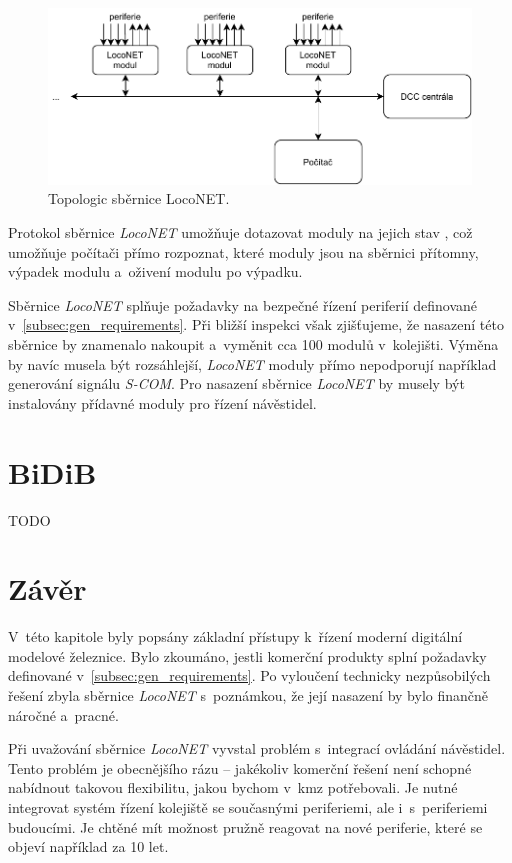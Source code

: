 \begin{figure}[ht!]
\includegraphics[width=\textwidth]{data/loconet.pdf}
\caption{Topologic sběrnice LocoNET.}
\label{fig:loconet-topology}
\end{figure}

Protokol sběrnice \textit{LocoNET} umožňuje dotazovat moduly na jejich stav
\cite{loconet-specs}, což umožňuje počítači přímo rozpoznat, které moduly jsou
na sběrnici přítomny, výpadek modulu a~oživení modulu po výpadku.

Sběrnice \textit{LocoNET} splňuje požadavky na bezpečné řízení periferií
definované v~\ref{subsec:gen_requirements}. Při bližší inspekci však
zjišťujeme, že nasazení této sběrnice by znamenalo nakoupit a~vyměnit cca 100
modulů v~kolejišti. Výměna by navíc musela být rozsáhlejší, \textit{LocoNET}
moduly přímo nepodporují například generování signálu \textit{S-COM}. Pro
nasazení sběrnice \textit{LocoNET} by musely být instalovány přídavné moduly
pro řízení návěstidel.

\section{BiDiB}

TODO

\section{Závěr}

V~této kapitole byly popsány základní přístupy k~řízení moderní digitální
modelové železnice. Bylo zkoumáno, jestli komerční produkty splní požadavky
definované v~\ref{subsec:gen_requirements}. Po vyloučení technicky
nezpůsobilých řešení zbyla sběrnice \textit{LocoNET} s~poznámkou, že její
nasazení by bylo finančně náročné a~pracné.

Při uvažování sběrnice \textit{LocoNET} vyvstal problém s~integrací ovládání
návěstidel. Tento problém je obecnějšího rázu – jakékoliv komerční řešení není
schopné nabídnout takovou flexibilitu, jakou bychom v~\gls{kmz} potřebovali.
Je nutné integrovat systém řízení kolejiště se současnými periferiemi, ale
i~s~periferiemi budoucími. Je chtěné mít možnost pružně reagovat na nové
periferie, které se objeví například za 10 let.

